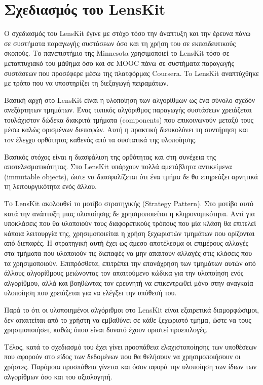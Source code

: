\section{Σχεδιασμός του \en LensKit}
Ο σχεδιασμός του {\en LensKit} έγινε με στόχο τόσο την άναπτυξη και την έρευνα πάνω σε συστήματα παραγωγής συστάσεων όσο και τη χρήση του σε εκπαιδευτικούς σκοπούς. Το πανεπιστήμιο της {\en Minnesota} χρησιμοποιεί το {\en LensKit} τόσο σε μεταπτυχιακό του μάθημα όσο και σε {\en MOOC} πάνω σε συστήματα παραγωγής συστάσεων που προσέφερε μέσω της πλατφόρμας {\en Coursera}. To {\en LensKit} αναπτύχθηκε με τρόπο που να υποστηρίζει τη διεξαγωγή πειραμάτων.\cite{Konstan:2015:TRS:2744768.2728171} \par
Βασική αρχή στο {\en LensKit} είναι η υλοποίηση των αλγορίθμων ως ένα σύνολο σχεδόν ανεξάρτητων τμημάτων. Ένας τυπικός αλγόριθμος παραγωγής συστάσεων χρειάζεται τουλάχιστον δώδεκα διακριτά τμήματα ({\en components}) που επικοινωνούν μεταξύ τους μέσω καλώς ορισμένων διεπαφών. Αυτή η πρακτική διευκολύνει τη συντήρηση και τoν έλεγχο ορθότητας καθενός από τα συστατικά της υλοποίησης. \par
Βασικός στόχος είναι η διασφάλιση της ορθότητας και στη συνέχεια της αποτελεσματικότητας. Στο {\en LensKit} υπάρχουν πολλά αμετάβλητα αντικείμενα ({\en immutable objects}), ώστε να διασφαλίζεται ότι ένα τμήμα δε θα επηρεάζει αρνητικά τη λειτουργικότητα ενός άλλου. \par
Το {\en LensKit} ακολουθεί το μοτίβο στρατηγικής ({\en Strategy Pattern}). Στο μοτίβο αυτό κατά την ανάπτυξη μιας υλοποίησης δε χρησιμοποιείται η κληρονομικότητα. Αντί για υποκλάσεις που θα υλοποιούν τους διαφορετικούς τρόπους που μία κλάση θα επιτελεί κάποια λειτουργία της, χρησιμοποιείται η χρήση ξεχωριστών τμημάτων που ορίζονται από διεπαφές.\cite{Gamma:1995:DPE:186897} Η στρατηγική αυτή έχει ως άμεσο αποτέλεσμα οι επιμέρους αλλαγές στα τμήματα που υλοποιούν τις διεπαφές να μην απαιτούν αλλαγές στις κλάσεις που τα χρησιμοποιούν. Επιπρόσθετα, επιτρέπει την επανάχρηση των τμημάτων αυτών από άλλους αλγορίθμους μειώνοντας τον απαιτούμενο κώδικα για την υλοποίηση ενός αλγορίθμου, αλλά και βοηθώντας τον ερευνητή να επικεντρωθεί μόνο στην αναγκαία υλοποίηση που χρειάζεται για να ελέγξει την υπόθεσή του. \par
Παρά το ότι οι υλοποιημένοι αλγόριθμοι στο {\en LensKit} είναι εξαιρετικά διαμορφώσιμοι, δεν απαιτείται από το χρήστη να εμβαθύνει σε κάθε ξεχωριστό τμήμα, ώστε να τους χρησιμοποιήσει, καθώς όπου είναι δυνατό έχουν οριστεί προεπιλογές. 
\par Τέλος, κατά το σχεδιασμό του έχει γίνει προσπάθεια ελαχιστοποίησης των υποθέσεων που αφορούν στο είδος των δεδομένων που θα θελήσουν να χρησιμοποιήσουν οι χρήστες. Παρόμοια προσπάθεια γίνεται και όσον αφορά την υλοποίηση των ίδιων των αλγορίθμων όσο και του αξιολογητή.

